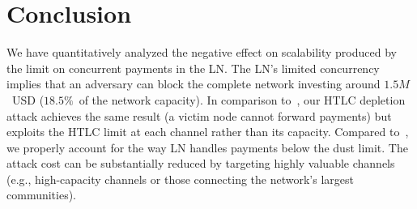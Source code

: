 \section{Conclusion}

We have quantitatively analyzed the negative effect on scalability produced by the limit on concurrent payments in the LN\@.
The LN's limited concurrency implies that an adversary can block the complete network investing around $1.5M$~USD ($18.5\%$~of the network capacity).
In comparison to~\cite{PerezSola2019}, our HTLC depletion attack achieves the same result (a victim node cannot forward payments) but exploits the HTLC limit at each channel rather than its capacity.
Compared to~\cite{Mizrahi2020}, we properly account for the way LN handles payments below the dust limit.
The attack cost can be substantially reduced by targeting highly valuable channels (e.g., high-capacity channels or those connecting the network's largest communities).
